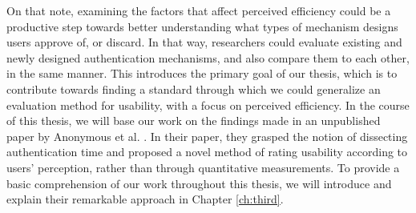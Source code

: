 On that note, examining the factors that affect perceived efficiency could be a productive step towards better understanding what types of mechanism designs users approve of, or discard. In that way, researchers could evaluate existing and newly designed authentication mechanisms, and also compare them to each other, in the same manner. This introduces the primary goal of our thesis, which is to contribute towards finding a standard through which we could generalize an evaluation method for usability, with a focus on perceived efficiency. In the course of this thesis, we will base our work on the findings made in an unpublished paper by Anonymous et al. \cite{anonymous}. In their paper, they grasped the notion of dissecting authentication time and proposed a novel method of rating usability according to users' perception, rather than through quantitative measurements. To provide a basic comprehension of our work throughout this thesis, we will introduce and explain their remarkable approach in Chapter \ref{ch:third}.\\



